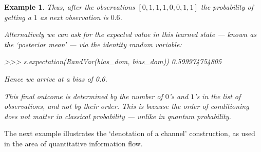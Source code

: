 \documentclass[leqno]{tufte-book} %
\newtheorem{example}[theorem]{Example}
\begin{document}
\begin{example}
\noindent Thus, after the observations $[0,1,1,1,0,0,1,1]$ the
probability of getting a $1$ as next observation is $0.6$.

Alternatively we can ask for the expected value in this
learned state --- known as the `posterior mean' --- via the identity
random variable:
\begin{python}
>>> s.expectation(RandVar(bias_dom, bias_dom))
0.599974754805
\end{python}

\noindent Hence we arrive at a bias of 0.6. 


This final outcome is determined by the number of $0$'s and $1$'s in
the list of observations, and not by their order. This is because the
order of conditioning does not matter in classical probability ---
unlike in quantum probability.
\end{example}



The next example illustrates the `denotation of a channel'
construction, as used in the area of quantitative information flow.
\end{document}
